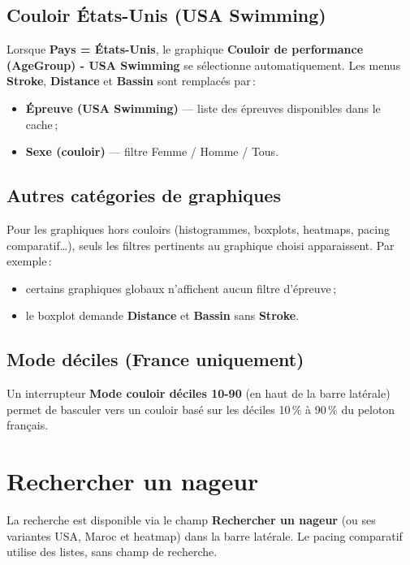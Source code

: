 \documentclass[11pt,a4paper]{article}
\begin{document}
\subsection{Couloir États-Unis (USA Swimming)}

Lorsque \textbf{Pays = États-Unis}, le graphique \textbf{Couloir de performance (AgeGroup) - USA Swimming} se sélectionne automatiquement. Les menus \textbf{Stroke}, \textbf{Distance} et \textbf{Bassin} sont remplacés par\,:

\begin{itemize}
  \item \textbf{Épreuve (USA Swimming)} --- liste des épreuves disponibles dans le cache\,;
  \item \textbf{Sexe (couloir)} --- filtre Femme / Homme / Tous.
\end{itemize}

\subsection{Autres catégories de graphiques}

Pour les graphiques hors couloirs (histogrammes, boxplots, heatmaps, pacing comparatif\ldots), seuls les filtres pertinents au graphique choisi apparaissent. Par exemple\,:
\begin{itemize}
  \item certains graphiques globaux n'affichent aucun filtre d'épreuve\,;
  \item le boxplot demande \textbf{Distance} et \textbf{Bassin} sans \textbf{Stroke}.
\end{itemize}

\subsection{Mode déciles (France uniquement)}
\label{sec:deciles}

Un interrupteur \textbf{Mode couloir déciles 10-90} (en haut de la barre latérale) permet de basculer vers un couloir basé sur les déciles 10\,\% à 90\,\% du peloton français.

\section{Rechercher un nageur}

La recherche est disponible via le champ \textbf{Rechercher un nageur} (ou ses variantes USA, Maroc et heatmap) dans la barre latérale. Le pacing comparatif utilise des listes, sans champ de recherche.
\end{document}
